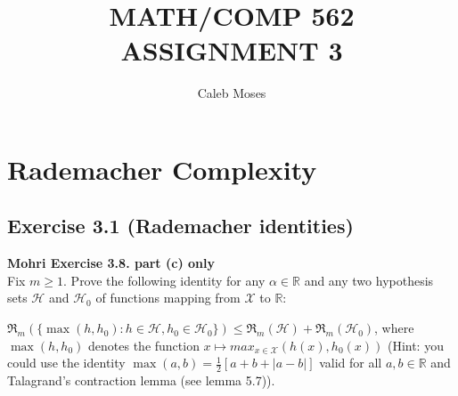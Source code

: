 \documentclass[
10pt, %
a4paper, %
oneside, %
headinclude,footinclude, %
BCOR5mm, %
]{scrartcl}
\author{\spacedlowsmallcaps{Caleb Moses*}} %
\date{} %
\title{MATH/COMP 562 ASSIGNMENT 3}
\author{Caleb Moses}
\newenvironment{problem}[2][]
               { \begin{mdframed}[backgroundcolor=gray!20] \textbf{#1 #2} \\}
               {  \end{mdframed}}
\begin{document}
\maketitle

\section*{Rademacher Complexity}
\subsection*{Exercise 3.1 (Rademacher identities)}
\begin{problem}{Mohri Exercise 3.8. part (c) only}
Fix $m \geq 1$. Prove the following identity for any $\alpha \in \mathbb{R}$ and any two hypothesis sets $\mathcal{H}$ and $\mathcal{H}_0$ of functions mapping from $\mathcal{X}$ to $\mathbb{R}$:

$\mathfrak{R}_m(\{\max(h, h_0 ): h \in \mathcal{H}, h_0 \in \mathcal{H}_0 \}) \leq \mathfrak{R}_m (\mathcal{H}) + \mathfrak{R}_m (\mathcal{H}_0)$, where $\max(h, h_0 )$ denotes the function $x \mapsto max_{x\in \mathcal{X}} (h(x), h_0 (x))$ (Hint: you could use the identity $\max(a, b) = \frac{1}{2} [a + b + |a - b|]$ valid for all $a, b \in \mathbb{R}$ and Talagrand’s contraction lemma (see lemma 5.7)).
\end{problem}
\end{document}
